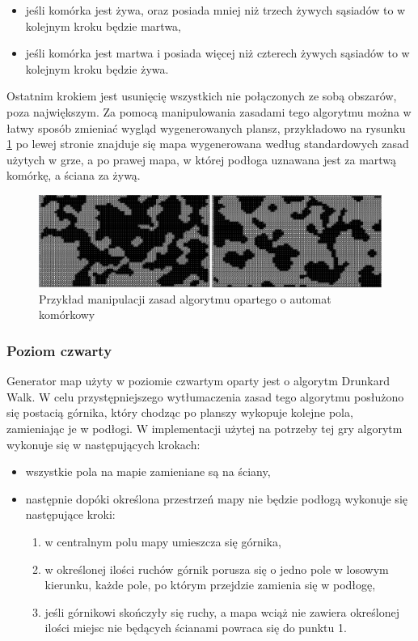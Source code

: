 \documentclass[12pt,twoside]{article}
\begin{document}
\begin{itemize}
	\item jeśli komórka jest żywa, oraz posiada mniej niż trzech żywych sąsiadów to w kolejnym kroku będzie martwa,
	\item jeśli komórka jest martwa i posiada więcej niż czterech żywych sąsiadów to w kolejnym kroku będzie żywa.
\end{itemize}

Ostatnim krokiem jest usunięcię wszystkich nie połączonych ze sobą obszarów, poza największym.
Za pomocą manipulowania zasadami tego algorytmu można w łatwy sposób zmieniać wygląd wygenerowanych plansz, przykładowo na rysunku \ref{generators:ca_diff} po lewej stronie znajduje się mapa wygenerowana według standardowych zasad użytych w grze, a po prawej mapa, w której podłoga uznawana jest za martwą komórkę, a ściana za żywą.

\FloatBarrier
\begin{figure}[h]
	\centering
	\includegraphics[width=16cm]{images/generators/ca_diff.png}
	\caption{Przykład manipulacji zasad algorytmu opartego o automat komórkowy}
	\label{generators:ca_diff}
\end{figure}
\FloatBarrier


\subsubsection{Poziom czwarty}
Generator map użyty w poziomie czwartym oparty jest o algorytm Drunkard Walk. W celu przystępniejszego wytłumaczenia zasad tego algorytmu posłużono się postacią górnika, który chodząc po planszy wykopuje kolejne pola, zamieniając je w podłogi. W implementacji użytej na potrzeby tej gry algorytm wykonuje się w następujących krokach:

\begin{itemize}
	\item wszystkie pola na mapie zamieniane są na ściany,
	\item następnie dopóki określona przestrzeń mapy nie będzie podłogą wykonuje się następujące kroki:
	\begin{enumerate}
		\item w centralnym polu mapy umieszcza się górnika,
		\item w określonej ilości ruchów górnik porusza się o jedno pole w losowym kierunku, każde pole, po którym przejdzie zamienia się w podłogę,
		\item jeśli górnikowi skończyły się ruchy, a mapa wciąż nie zawiera określonej ilości miejsc nie będących ścianami powraca się do punktu 1.
	\end{enumerate}	
\end{itemize}
\end{document}
